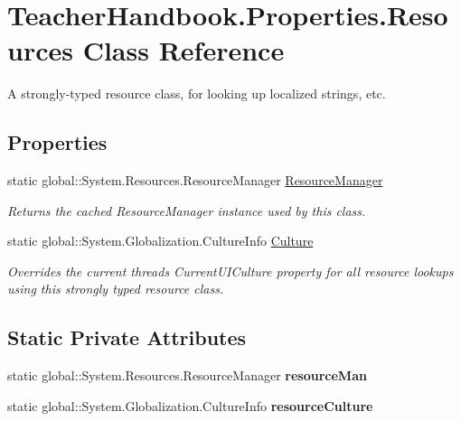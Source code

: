 \hypertarget{class_teacher_handbook_1_1_properties_1_1_resources}{}\section{Teacher\+Handbook.\+Properties.\+Resources Class Reference}
\label{class_teacher_handbook_1_1_properties_1_1_resources}


A strongly-\/typed resource class, for looking up localized strings, etc.  


\subsection*{Properties}
\begin{DoxyCompactItemize}
\item 
static global\+::\+System.\+Resources.\+Resource\+Manager \mbox{\hyperlink{class_teacher_handbook_1_1_properties_1_1_resources_a21ca51d6f85c0dfdff618767488d942f}{Resource\+Manager}}
\begin{DoxyCompactList}\small\item\em Returns the cached Resource\+Manager instance used by this class. \end{DoxyCompactList}\item 
static global\+::\+System.\+Globalization.\+Culture\+Info \mbox{\hyperlink{class_teacher_handbook_1_1_properties_1_1_resources_a7d2a69e42deca52f95de104f0283705c}{Culture}}
\begin{DoxyCompactList}\small\item\em Overrides the current thread\textquotesingle{}s Current\+U\+I\+Culture property for all resource lookups using this strongly typed resource class. \end{DoxyCompactList}\end{DoxyCompactItemize}
\subsection*{Static Private Attributes}
\begin{DoxyCompactItemize}
\item 
\mbox{\label{class_teacher_handbook_1_1_properties_1_1_resources_a744ab1269c4931be089de79e8e1866bb}} 
static global\+::\+System.\+Resources.\+Resource\+Manager {\bfseries resource\+Man}
\item 
\mbox{\label{class_teacher_handbook_1_1_properties_1_1_resources_a63cc181fd05c1ca38e3524ff28794761}} 
static global\+::\+System.\+Globalization.\+Culture\+Info {\bfseries resource\+Culture}
\end{DoxyCompactItemize}


